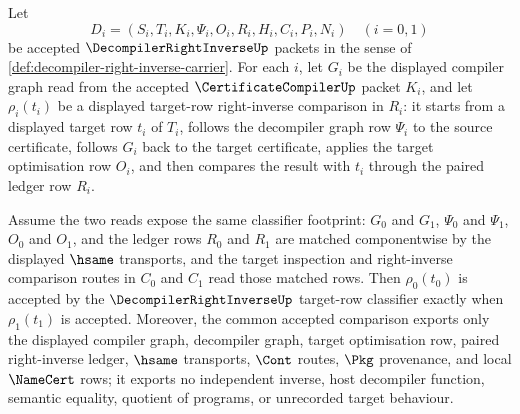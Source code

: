 \begin{theorem}
\label{thm:decompiler-right-inverse-target-row-classifier}
Let
$$
D_i=(S_i,T_i,K_i,\Psi_i,O_i,R_i,H_i,C_i,P_i,N_i)\quad (i=0,1)
$$
be accepted $\DecompilerRightInverseUp$ packets in the sense of \autoref{def:decompiler-right-inverse-carrier}. For each $i$, let $G_i$ be the displayed compiler graph read from the accepted $\CertificateCompilerUp$ packet $K_i$, and let $\rho_i(t_i)$ be a displayed target-row right-inverse comparison in $R_i$: it starts from a displayed target row $t_i$ of $T_i$, follows the decompiler graph row $\Psi_i$ to the source certificate, follows $G_i$ back to the target certificate, applies the target optimisation row $O_i$, and then compares the result with $t_i$ through the paired ledger row $R_i$.

Assume the two reads expose the same classifier footprint: $G_0$ and $G_1$, $\Psi_0$ and $\Psi_1$, $O_0$ and $O_1$, and the ledger rows $R_0$ and $R_1$ are matched componentwise by the displayed $\hsame$ transports, and the target inspection and right-inverse comparison routes in $C_0$ and $C_1$ read those matched rows. Then $\rho_0(t_0)$ is accepted by the $\DecompilerRightInverseUp$ target-row classifier exactly when $\rho_1(t_1)$ is accepted. Moreover, the common accepted comparison exports only the displayed compiler graph, decompiler graph, target optimisation row, paired right-inverse ledger, $\hsame$ transports, $\Cont$ routes, $\Pkg$ provenance, and local $\NameCert$ rows; it exports no independent inverse, host decompiler function, semantic equality, quotient of programs, or unrecorded target behaviour.
\end{theorem}
